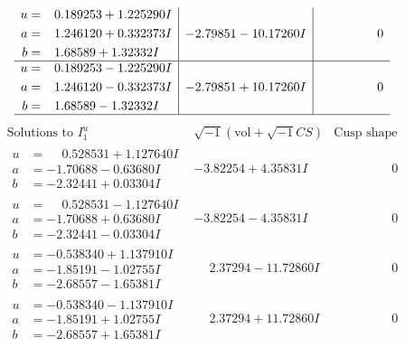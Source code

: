 \documentclass[1p]{elsarticle_modified}
\theoremstyle{definition}
\newcommand{\I}{\sqrt{-1}}
\begin{document}
$$\begin{array}{c|c|c}
\begin{aligned}
u &= \phantom{-}0.189253 + 1.225290 I \\
a &= \phantom{-}1.246120 + 0.332373 I \\
b &= \phantom{-}1.68589 + 1.32332 I\end{aligned}
 & -2.79851 - 10.17260 I & \phantom{-0.000000 } 0 \\ \hline\begin{aligned}
u &= \phantom{-}0.189253 - 1.225290 I \\
a &= \phantom{-}1.246120 - 0.332373 I \\
b &= \phantom{-}1.68589 - 1.32332 I\end{aligned}
 & -2.79851 + 10.17260 I & \phantom{-0.000000 } 0\\
 \hline 
 \end{array}$$\newpage$$\begin{array}{c|c|c}  
\text{Solutions to }I^u_{1}& \I (\text{vol} + \sqrt{-1}CS) & \text{Cusp shape}\\
 \hline 
\begin{aligned}
u &= \phantom{-}0.528531 + 1.127640 I \\
a &= -1.70688 - 0.63680 I \\
b &= -2.32441 + 0.03304 I\end{aligned}
 & -3.82254 + 4.35831 I & \phantom{-0.000000 } 0 \\ \hline\begin{aligned}
u &= \phantom{-}0.528531 - 1.127640 I \\
a &= -1.70688 + 0.63680 I \\
b &= -2.32441 - 0.03304 I\end{aligned}
 & -3.82254 - 4.35831 I & \phantom{-0.000000 } 0 \\ \hline\begin{aligned}
u &= -0.538340 + 1.137910 I \\
a &= -1.85191 - 1.02755 I \\
b &= -2.68557 - 1.65381 I\end{aligned}
 & \phantom{-}2.37294 - 11.72860 I & \phantom{-0.000000 } 0 \\ \hline\begin{aligned}
u &= -0.538340 - 1.137910 I \\
a &= -1.85191 + 1.02755 I \\
b &= -2.68557 + 1.65381 I\end{aligned}
 & \phantom{-}2.37294 + 11.72860 I & \phantom{-0.000000 } 0 \\ \hline\begin{aligned}

\end{aligned}
\end{array}$$
\end{document}

